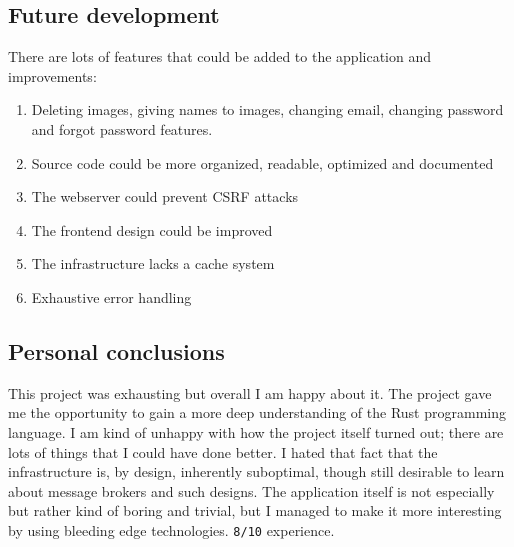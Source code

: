 \documentclass[../documentation.tex]{subfiles}
\begin{document}
\subsection{Future development}

There are lots of features that could be added to the application and improvements:
\begin{enumerate}
    \item Deleting images, giving names to images, changing email,
        changing password and forgot password features.
    \item Source code could be more organized, readable, optimized and documented
    \item The webserver could prevent CSRF attacks
    \item The frontend design could be improved
    \item The infrastructure lacks a cache system
    \item Exhaustive error handling
\end{enumerate}

\subsection{Personal conclusions}

This project was exhausting but overall I am happy about it.
The project gave me the opportunity to gain a more deep
understanding of the Rust programming language. I am kind of unhappy
with how the project itself turned out; there are lots of things
that I could have done better. I hated that fact that
the infrastructure is, by design, inherently suboptimal,
though still desirable to learn about message brokers and such designs.
The application itself is not especially 
but rather kind of boring and trivial, but I managed
to make it more interesting by using bleeding edge technologies.
\texttt{8/10} experience.
\end{document}
